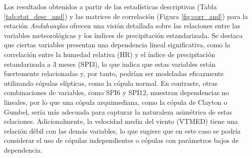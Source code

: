 Los resultados obtenidos a partir de las estadísticas descriptivas (Tabla \ref{tab:stat_desc_and}) y las matrices de correlación (Figura \ref{fig:corr_and}) para la estación \textit{Andahuaylas} ofrecen una visión detallada sobre las relaciones entre las variables meteorológicas y los índices de precipitación estandarizada. Se destaca que ciertas variables presentan una dependencia lineal significativa, como la correlación entre la humedad relativa (HR) y el índice de precipitación estandarizada a 3 meses (SPI3), lo que indica que estas variables están fuertemente relacionadas y, por tanto, podrían ser modeladas eficazmente utilizando cópulas elípticas, como la cópula normal. En contraste, otras combinaciones de variables, como SPI6 y SPI12, muestran dependencias no lineales, por lo que una cópula arquimediana, como la cópula de Clayton o Gumbel, sería más adecuada para capturar la naturaleza asimétrica de estas relaciones. Adicionalmente, la velocidad media del viento (VTMED) tiene una relación débil con las demás variables, lo que sugiere que en este caso se podría considerar el uso de cópulas independientes o cópulas con parámetros bajos de dependencia. %









